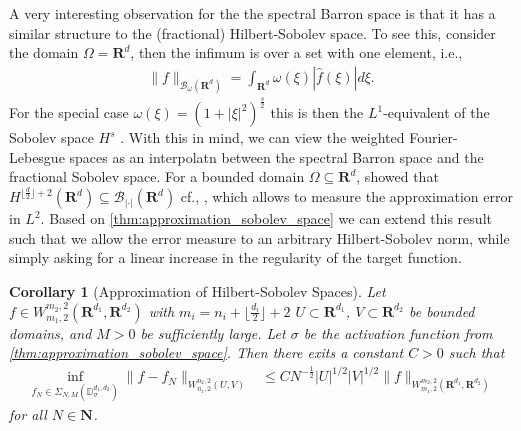 \documentclass[a4paper]{article}
\newcommand{\nn}[1]{\mathbf{N}^{#1}}
\newcommand{\rr}[1]{\mathbf{R}^{#1}}
\newcommand{\rrI}{\rr{d_1}}
\newcommand{\rrII}{\rr{d_2}}
\newcommand{\abs}[1]{| #1|}     %
\newcommand{\norm}[2]{\|#1\|_{#2}}
\numberwithin{equation}{section}
\newtheorem{corollary}[theorem]{Corollary}
\theoremstyle{remark}
\begin{document}
A very interesting observation for the
the spectral Barron space is that it has
a similar structure to the (fractional) Hilbert-Sobolev space.
To see this, consider the domain $\Omega=\rr{d}$,
then the infimum is over a set with one element, i.e.,
\begin{align*}
    \norm{f}{\mathscr{B}_{\omega}(\rr{d})}
    =
    \int_{\rr{d}}\omega(\xi)\abs{\hat{f}(\xi)}d\xi.
\end{align*}
For the special case $\omega(\xi)=(1+\abs{\xi}^{2})^{\frac{s}{2}}$
this is then the $L^1$-equivalent of the Sobolev space $H^s$ \cite[Definition 7.9.1]{Hormander98AnalysisLinearPartial}.
With this in mind,
we can view the weighted Fourier-Lebesgue spaces
as an interpolatn between the spectral Barron space
and the fractional Sobolev space.
For a bounded domain $\Omega\subseteq \rr{d}$, \citeauthor{Barron93UniversalApproximationBounds} showed that
$H^{\lfloor\frac{d}{2}\rfloor+2}(\rr{d})
\subseteq
\mathscr{B}_{\abs{\cdot}}(\rr{d})$
cf., \cite[Property 15]{Barron93UniversalApproximationBounds},
which allows to measure the approximation error in $L^2$.
Based on \cref{thm:approximation_sobolev_space}
we can extend this result
such that we allow the error measure
to an arbitrary Hilbert-Sobolev norm,
while simply asking for a linear increase in the regularity of the target function.

\begin{corollary}[Approximation of Hilbert-Sobolev Spaces]
    Let
    $f\in 
    W_{m_1,2}^{m_2,2}(\rrI, \rrII)$
    with $m_i=n_i+\lfloor\frac{d_i}{2}\rfloor+2$
    $U\subset\rrI$, $V\subset\rrII$ be bounded domains,
    and $M>0$ be sufficiently large. Let $\sigma$ be the activation function
    from  \cref{thm:approximation_sobolev_space}.
    Then
    there exits a constant $C>0$ such that
    \begin{align}
    \label{eq:cor_approximation_bound}
        \inf_{f_{N}\in \Sigma_{N,M}(\mathbb{D}_\sigma^{d_1,d_2})}\norm{f-f_N}{W_{n_1,2}^{n_2,2}(U,V)}
        &\leq C N^{-\frac{1}{2}} \abs{U}^{1/2} \abs{V}^{1/2}
        \norm{f}{W_{m_1,2}^{m_2,2}(\rrI, \rrII)}
    \end{align}
    for all $N\in\nn{}$.
\end{corollary}
\end{document}
